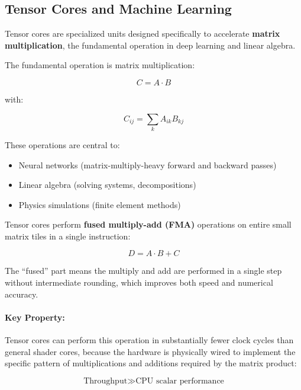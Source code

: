 \documentclass[11pt]{article}
\begin{document}
\subsection{Tensor Cores and Machine Learning}

Tensor cores are specialized units designed specifically to accelerate \textbf{matrix multiplication}, the fundamental operation in deep learning and linear algebra.

The fundamental operation is matrix multiplication:

\begin{equation}
    C = A \cdot B
\end{equation}

with:

\begin{equation}
    C_{ij} = \sum_k A_{ik} B_{kj}
\end{equation}

These operations are central to:

\begin{itemize}
    \item Neural networks (matrix-multiply-heavy forward and backward passes)
    \item Linear algebra (solving systems, decompositions)
    \item Physics simulations (finite element methods)
\end{itemize}

Tensor cores perform \textbf{fused multiply-add (FMA)} operations on entire small matrix tiles in a single instruction:

\begin{equation}
    D = A \cdot B + C
\end{equation}

The ``fused'' part means the multiply and add are performed in a single step without intermediate rounding, which improves both speed and numerical accuracy.

\paragraph{Key Property:}

Tensor cores can perform this operation in substantially fewer clock cycles than general shader cores, because the hardware is physically wired to implement the specific pattern of multiplications and additions required by the matrix product:

\begin{equation}
    \text{Throughput} \gg \text{CPU scalar performance}
\end{equation}
\end{document}
